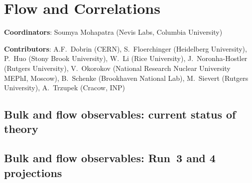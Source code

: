 \documentclass[../report.tex]{subfiles}
\providecommand{\main}{..}
\begin{document}
\section{Flow and Correlations}
\label{sec:flow}

{ \small
\noindent \textbf{Coordinators}: Soumya Mohapatra (Nevis Labs, Columbia University)

\noindent \textbf{Contributors}: 
A.F.~Dobrin (CERN), 
S.~Floerchinger (Heidelberg University), 
P.~Huo (Stony Brook University), 
W.~Li (Rice University), 
J.~Noronha-Hostler (Rutgers University), 
V.~Okorokov (National Research Nuclear University MEPhI, Moscow), 
B.~Schenke (Brookhaven National Lab), 
M.~Sievert (Rutgers University), 
A.~Trzupek (Cracow, INP)
}

\subsection{Bulk and flow observables: current status of theory}
\FloatBarrier
\subsection{Bulk and flow observables: Run~3 and 4 projections}
\FloatBarrier
\FloatBarrier
\FloatBarrier
\FloatBarrier
\FloatBarrier
\end{document}
